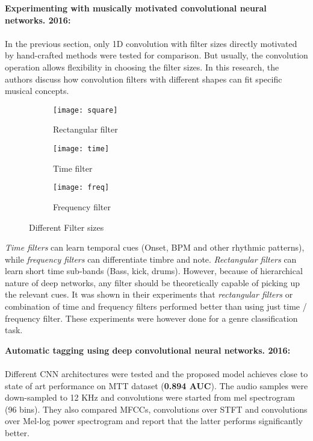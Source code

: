 \noindent \textbf{Experimenting with musically motivated convolutional neural networks. 2016\cite{MusicMotive}:}\\
\\
\noindent In the previous section, only 1D convolution with filter sizes directly motivated by hand-crafted methods were tested for comparison. But usually, the convolution operation allows flexibility in choosing the filter sizes. In this research, the authors discuss how convolution filters with different shapes can fit specific musical concepts. 
\begin{figure}[h]
       \begin{subfigure}[b]{0.3\textwidth}
        \texttt{[image: square]}
        \caption{Rectangular filter }
        \label{fig:square}
       \end{subfigure}
	    \begin{subfigure}[b]{0.3\textwidth}
        \texttt{[image: time]}
        \caption{
        Time filter
        }
        \label{fig:time}
       \end{subfigure}
       	    \begin{subfigure}[b]{0.3\textwidth}
        \texttt{[image: freq]}
        \caption{
        Frequency filter
        }
        \label{fig:freq}
       \end{subfigure}
       \caption{Different Filter sizes}\label{fig:STFT}
\end{figure}
\FloatBarrier
\bigskip 
\noindent \textit{Time filters} can learn temporal cues (Onset, BPM and other rhythmic patterns), while \textit{frequency filters} can differentiate timbre and note. \textit{Rectangular filters} can learn short time sub-bands (Bass, kick, drums)\cite{MusicMotive}. However, because of hierarchical nature of deep networks, any filter should be theoretically capable of picking up the relevant cues. It was shown in their experiments that \textit{rectangular filters} or combination of time and frequency filters performed better than using just time / frequency filter. These experiments were however done for a genre classification task. 
\bigskip
 
\noindent \textbf{Automatic tagging using deep convolutional neural networks. 2016\cite{choi_cnn}:}\\
\\
\noindent Different CNN architectures were tested and the proposed model achieves close to state of art performance on MTT dataset (\textbf{0.894 AUC}). The audio samples were down-sampled to 12 KHz and convolutions were started from mel spectrogram (96 bins). They also compared MFCCs, convolutions over STFT and convolutions over Mel-log power spectrogram and report that the latter performs significantly better. 

